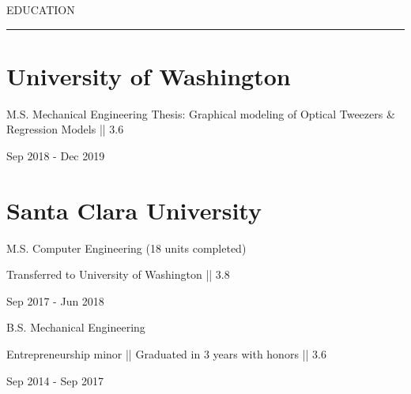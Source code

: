 \documentclass[letterpaper,10pt,oneside]{article}
\begin{document}
\begin{body}


\vspace{2ex}

{\color{cblue}
{EDUCATION} %
}

\vspace{-3.5ex}
\hspace{-1.25in}\noindent\color{dblue}\rule{6.935in}{0.4pt} 
\vspace{-5.5ex}

\section
{\textbf{University of Washington}}{}

{\small M.S. Mechanical Engineering}
\BulletItem
{\small Thesis: Graphical modeling of Optical Tweezers \& Regression Models || 3.6}

\begin{subtitle}
\vspace{-8ex}
{{Sep 2018 - Dec 2019}}
\end{subtitle}

\vspace{-1ex}


\section
{\textbf{Santa Clara University}}{}{}

{{\small M.S. Computer Engineering (18 units completed)}}
\begin{detail}
\BulletItem
Transferred to University of Washington || 3.8
\end{detail}

\begin{subtitle}
\vspace{-8ex}
{{Sep 2017 - Jun 2018}}
\end{subtitle}
\vspace{1ex}
    

{{\small B.S. Mechanical Engineering}}
\begin{detail}
\BulletItem
Entrepreneurship minor || Graduated in 3 years with honors || 3.6
\end{detail}

\begin{subtitle}
\vspace{-8ex}
{{Sep 2014 - Sep 2017}}
\end{subtitle}
\vspace{3ex}



\end{body}
\end{document}
